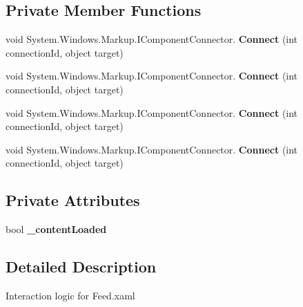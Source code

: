 \subsection*{Private Member Functions}
\begin{DoxyCompactItemize}
\item 
\mbox{\label{class_teacher_handbook_1_1_plugins_1_1_feed_1_1_page_a974655f42ad07adb21a4c1dba32fd293}} 
void System.\+Windows.\+Markup.\+I\+Component\+Connector. {\bfseries Connect} (int connection\+Id, object target)
\item 
\mbox{\label{class_teacher_handbook_1_1_plugins_1_1_feed_1_1_page_a974655f42ad07adb21a4c1dba32fd293}} 
void System.\+Windows.\+Markup.\+I\+Component\+Connector. {\bfseries Connect} (int connection\+Id, object target)
\item 
\mbox{\label{class_teacher_handbook_1_1_plugins_1_1_feed_1_1_page_a974655f42ad07adb21a4c1dba32fd293}} 
void System.\+Windows.\+Markup.\+I\+Component\+Connector. {\bfseries Connect} (int connection\+Id, object target)
\item 
\mbox{\label{class_teacher_handbook_1_1_plugins_1_1_feed_1_1_page_a974655f42ad07adb21a4c1dba32fd293}} 
void System.\+Windows.\+Markup.\+I\+Component\+Connector. {\bfseries Connect} (int connection\+Id, object target)
\end{DoxyCompactItemize}
\subsection*{Private Attributes}
\begin{DoxyCompactItemize}
\item 
\mbox{\label{class_teacher_handbook_1_1_plugins_1_1_feed_1_1_page_ac5de5ee3c1345998e007c4cbf4c3c4ae}} 
bool {\bfseries \+\_\+content\+Loaded}
\end{DoxyCompactItemize}


\subsection{Detailed Description}
Interaction logic for Feed.\+xaml 


